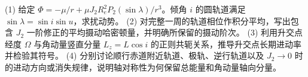 (1) 给定 \(\Phi=-\mu/r+\mu J_2R_e^2P_2(\sin\lambda)/r^3\)。倾角 \(i\) 的圆轨道满足 \(\sin\lambda=\sin i\sin u\)，求扰动势。
(2) 对完整一周的轨道相位作积分平均，写出包含 \(J_2\) 一阶修正的平均摄动哈密顿量，并明确所保留的摄动阶次。
(3) 利用升交点经度 \(\Omega\) 与角动量竖直分量 \(L_z=L\cos i\) 的正则共轭关系，推导升交点长期进动率并检验其符号。
(4) 分别讨论顺行赤道附近轨道、极轨、逆行轨道以及 \(J_2\to0\) 时的进动方向或消失规律，说明轴对称性为何保留总能量和角动量轴向分量。
